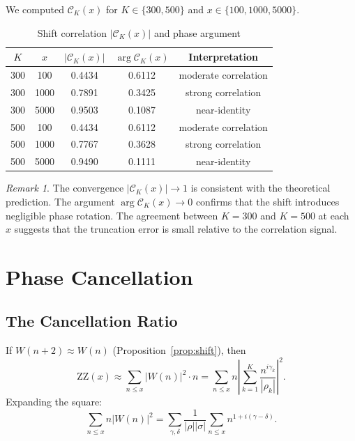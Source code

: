 \documentclass[11pt,a4paper]{article}
\theoremstyle{remark}
\newtheorem{remark}[theorem]{Remark}
\begin{document}
We computed $\mathcal{C}_K(x)$ for $K\in\{300,500\}$ and $x\in\{100,1000,5000\}$.

\begin{table}[h]
\centering
\caption{Shift correlation $|\mathcal{C}_K(x)|$ and phase argument}
\label{tab:correlation}
\begin{tabular}{ccccc}
\toprule
$K$ & $x$ & $|\mathcal{C}_K(x)|$ & $\arg\mathcal{C}_K(x)$ & Interpretation \\
\midrule
300 & 100   & 0.4434 & 0.6112 & moderate correlation \\
300 & 1000  & 0.7891 & 0.3425 & strong correlation \\
300 & 5000  & 0.9503 & 0.1087 & near-identity \\
\midrule
500 & 100   & 0.4434 & 0.6112 & moderate correlation \\
500 & 1000  & 0.7767 & 0.3628 & strong correlation \\
500 & 5000  & 0.9490 & 0.1111 & near-identity \\
\bottomrule
\end{tabular}
\end{table}

\begin{remark}
The convergence $|\mathcal{C}_K(x)|\to 1$ is consistent with the theoretical prediction.
The argument $\arg\mathcal{C}_K(x)\to 0$ confirms that the shift introduces negligible phase rotation.
The agreement between $K=300$ and $K=500$ at each $x$ suggests that the truncation error is small relative to the correlation signal.
\end{remark}

\section{Phase Cancellation}\label{sec:cancellation}

\subsection{The Cancellation Ratio}

If $W(n+2)\approx W(n)$ (Proposition~\ref{prop:shift}), then
\begin{equation}\label{eq:ZZ_approx}
\mathrm{ZZ}(x)\approx\sum_{n\le x}|W(n)|^2\cdot n = \sum_{n\le x}n\left|\sum_{k=1}^K\frac{n^{i\gamma_k}}{|\rho_k|}\right|^2.
\end{equation}
Expanding the square:
\begin{equation}\label{eq:WW_expand}
\sum_{n\le x}n|W(n)|^2 = \sum_{\gamma,\delta}\frac{1}{|\rho||\sigma|}\sum_{n\le x}n^{1+i(\gamma-\delta)}.
\end{equation}
\end{document}
